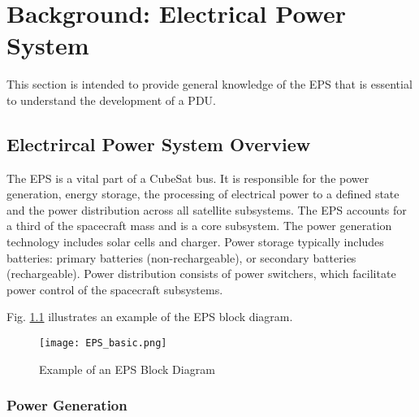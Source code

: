 \chapter{Background: Electrical Power System  \label{cha:chapter2}}
This section is intended to provide general knowledge of the EPS that is essential to understand the development of a PDU. 
 

\section{Electrircal Power System Overview \label{sec:tech}}
The EPS is a vital part of a CubeSat bus. It is responsible for the power generation, energy storage, the processing of electrical power to a defined state and the power distribution across all satellite subsystems. The EPS accounts for a third of the spacecraft mass and is a core subsystem. The power generation technology includes solar cells and charger. Power storage typically includes batteries: primary batteries (non-rechargeable), or secondary batteries (rechargeable). Power distribution consists of power switchers, which facilitate power control of the spacecraft subsystems.

Fig. \ref{fig: EPSS} illustrates an example of the EPS block diagram.



	\begin{figure}[h]
		\centering
		\texttt{[image: EPS\_basic.png]}
			\caption{Example of an EPS Block Diagram}
			\label{fig: EPSS}
	\end{figure}

\subsection{Power Generation \label{sec:tech00}}



